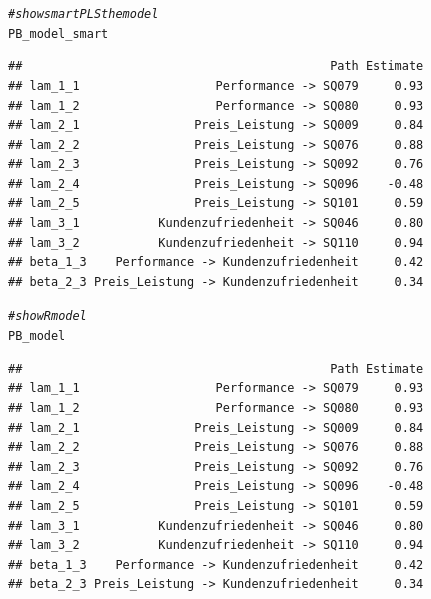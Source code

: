 \documentclass{article}\usepackage[]{graphicx}\usepackage[]{color}
\makeatletter
\newcommand{\hlcom}[1]{\textcolor[rgb]{0.678,0.584,0.686}{\textit{#1}}}%
\newcommand{\hlstd}[1]{\textcolor[rgb]{0.345,0.345,0.345}{#1}}%
\newenvironment{kframe}{%
 \def\at@end@of@kframe{}%
 \ifinner\ifhmode%
  \def\at@end@of@kframe{\end{minipage}}%
  \begin{minipage}{\columnwidth}%
 \fi\fi%
 \def\FrameCommand##1{\hskip\@totalleftmargin \hskip-\fboxsep
 \colorbox{shadecolor}{##1}\hskip-\fboxsep
     \hskip-\linewidth \hskip-\@totalleftmargin \hskip\columnwidth}%
 \MakeFramed {\advance\hsize-\width
   \@totalleftmargin\z@ \linewidth\hsize
   \@setminipage}}%
 {\par\unskip\endMakeFramed%
 \at@end@of@kframe}
\newenvironment{knitrout}{}{} %
\makeatother
\begin{document}
\begin{knitrout}
\begin{kframe}
\begin{alltt}
\hlcom{#show smartPLS the model}
\hlstd{PB_model_smart}
\end{alltt}
\begin{verbatim}
##                                           Path Estimate
## lam_1_1                   Performance -> SQ079     0.93
## lam_1_2                   Performance -> SQ080     0.93
## lam_2_1                Preis_Leistung -> SQ009     0.84
## lam_2_2                Preis_Leistung -> SQ076     0.88
## lam_2_3                Preis_Leistung -> SQ092     0.76
## lam_2_4                Preis_Leistung -> SQ096    -0.48
## lam_2_5                Preis_Leistung -> SQ101     0.59
## lam_3_1           Kundenzufriedenheit -> SQ046     0.80
## lam_3_2           Kundenzufriedenheit -> SQ110     0.94
## beta_1_3    Performance -> Kundenzufriedenheit     0.42
## beta_2_3 Preis_Leistung -> Kundenzufriedenheit     0.34
\end{verbatim}
\begin{alltt}
\hlcom{#show R model}
\hlstd{PB_model}
\end{alltt}
\begin{verbatim}
##                                           Path Estimate
## lam_1_1                   Performance -> SQ079     0.93
## lam_1_2                   Performance -> SQ080     0.93
## lam_2_1                Preis_Leistung -> SQ009     0.84
## lam_2_2                Preis_Leistung -> SQ076     0.88
## lam_2_3                Preis_Leistung -> SQ092     0.76
## lam_2_4                Preis_Leistung -> SQ096    -0.48
## lam_2_5                Preis_Leistung -> SQ101     0.59
## lam_3_1           Kundenzufriedenheit -> SQ046     0.80
## lam_3_2           Kundenzufriedenheit -> SQ110     0.94
## beta_1_3    Performance -> Kundenzufriedenheit     0.42
## beta_2_3 Preis_Leistung -> Kundenzufriedenheit     0.34
\end{verbatim}
\end{kframe}
\end{knitrout}
\end{document}
